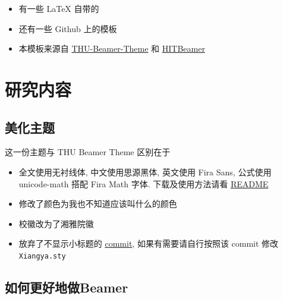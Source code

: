 \documentclass{beamer}
\begin{document}
\begin{frame}
    \begin{itemize}
        \item 有一些 \LaTeX{} 自带的
        \item 还有一些 Github 上的模板
        \item 本模板来源自 \href{https://www.latexstudio.net/archives/4051.html}{THU-Beamer-Theme} 和 \href{https://github.com/syvshc/HITBeamer}{HITBeamer}
    \end{itemize}
\end{frame}


\section{研究内容}

\subsection{美化主题}

\begin{frame}{这一份主题与 THU Beamer Theme 区别在于}
    \begin{itemize}
        \item 全文使用无衬线体, 中文使用思源黑体, 英文使用 Fira Sans, 公式使用 unicode-math 搭配 Fira Math 字体. 下载及使用方法请看  \href{https://github.com/natsumi-kitazato/XiangyaBeamer/README.md}{README}
        \item 修改了颜色为我也不知道应该叫什么的颜色
        \item 校徽改为了湘雅院徽
        \item 放弃了不显示小标题的 \href{https://github.com/Trinkle23897/THU-Beamer-Theme/commit/061f088d1c7e4b2d2f1f581f3745945ecbb63f25}{commit}, 如果有需要请自行按照该 commit 修改 \texttt{Xiangya.sty}
    \end{itemize}
\end{frame}

\subsection{如何更好地做Beamer}
\end{document}
